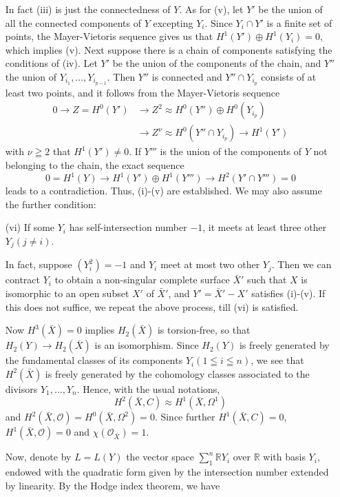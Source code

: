 \begin{itemize}
In fact (iii) is just the connectedness of $Y$. As for (v), let $Y'$ be the union of all the connected components of $Y$ excepting $Y_i$. Since $Y_i \cap Y'$ is a finite set of points, the Mayer-Vietoris sequence gives us that $H^1(Y') \oplus H^1 (Y_i) = 0$, which implies (v). Next suppose there is a chain of components satisfying the conditions of (iv). Let $Y'$ be the union of the components of the chain, and  $Y''$ the union of $Y_{i_1}, \ldots, Y_{i_{p-1}}$. Then $Y''$ is connected and $Y'' \cap Y_{i_p}$ consists of at least two points, and it follows from the Mayer-Vietoris sequence
\begin{align*}
0 \to Z = H^0 (Y') & \to Z^2 \approx H^0 (Y'') \oplus H^0(Y_{i_p})\\
& \to Z^\nu \approx H^0 (Y'' \cap Y_{i_p}) \to H^1 (Y')
\end{align*}
with $\nu \geqq 2$ that $H^1 (Y') \neq 0$. If $Y'''$ is the union of the components of $Y$ not belonging to the chain, the exact sequence
$$
0 = H^1(Y) \to H^1 (Y') \oplus H^1 (Y''') \to H^2 (Y' \cap Y''') = 0
$$\pageoriginale
leads to a contradiction. Thus, (i)-(v) are established. We may also assume the further condition:

\item[(vi)] If some $Y_i$ has self-intersection number $-1$, it meets at least three other $Y_j (j \neq i)$.

In fact, suppose $(Y^2_i) = -1$ and $Y_i$ meet at most two other $Y_j$. Then we can contract $Y_i$ to obtain a non-singular complete surface $\bar{X}'$ such that $X$ is isomorphic to an open subset $X'$ of $\bar{X}'$, and $Y' = \bar{X}' - X'$ satisfies (i)-(v). If this does not suffice, we repeat the above process, till (vi) is satisfied. 


Now $H^3 (\bar{X}) =0$ implies $H_2 (\bar{X})$ is torsion-free, so that $H_2 (Y)\to H_2 (\bar{X})$ is an isomorphism. Since $H_2 (Y)$ is freely generated by the fundamental classes of its components $Y_i (1 \leqq i \leqq n)$, we see that $H^2 (\bar{X})$ is freely generated by the cohomology classes associated to the divisors $Y_1, \ldots, Y_n$. Hence, with the usual notations,
$$
H^2 (\bar{X}, C) \approx H^1 (\bar{X}, \Omega^1)
$$
and $H^2 (\bar{X}, \mathscr{O}) = H^0 (\bar{X}, \Omega^2) =0$. Since further $H^1 (\bar{X}, C) = 0$, $H^1 (\bar{X}, \mathscr{O}) =0$ and $\chi (\mathscr{O}_{\bar{X}}) =1$.

Now, denote by $L = L (Y)$ the vector space $\sum^n_1 \mathbb{R} Y_i$ over $\mathbb{R}$ with basis $Y_i$, endowed with the quadratic form given by the intersection number extended by linearity. By the Hodge index theorem, we have


\end{itemize}
